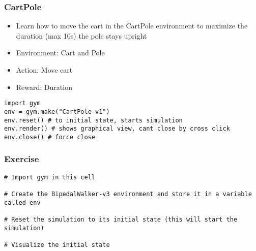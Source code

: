 \begin{frame}[fragile]\frametitle{CartPole}

\begin{itemize}
\item Learn how to move the cart in the CartPole environment to maximize the duration (max 10s) the pole stays upright
\item Environment: Cart and Pole
\item Action: Move cart
\item Reward: Duration
\end{itemize}

\begin{lstlisting}
import gym
env = gym.make("CartPole-v1")
env.reset() # to initial state, starts simulation
env.render() # shows graphical view, cant close by cross click
env.close() # force close
\end{lstlisting}

\end{frame}

\begin{frame}[fragile]\frametitle{Exercise}


\begin{lstlisting}
# Import gym in this cell

# Create the BipedalWalker-v3 environment and store it in a variable called env

# Reset the simulation to its initial state (this will start the simulation)

# Visualize the initial state
\end{lstlisting}

\end{frame}

